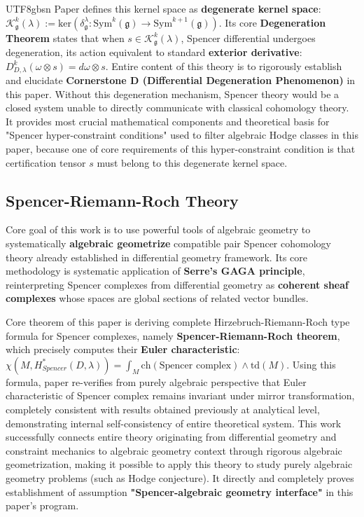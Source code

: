 \documentclass[a4paper,12pt]{extarticle}
\theoremstyle{definition}
\begin{document}
\begin{CJK}{UTF8}{gbsn}
Paper defines this kernel space as \textbf{degenerate kernel space}: $\mathcal{K}_{\mathfrak{g}}^k(\lambda) := \mathrm{ker}(\delta_{\mathfrak{g}}^\lambda : \mathrm{Sym}^k(\mathfrak{g}) \to \mathrm{Sym}^{k+1}(\mathfrak{g}))$. Its core \textbf{Degeneration Theorem} states that when $s \in \mathcal{K}_{\mathfrak{g}}^k(\lambda)$, Spencer differential undergoes degeneration, its action equivalent to standard \textbf{exterior derivative}: $D_{D,\lambda}^k(\omega \otimes s) = d\omega \otimes s$. Entire content of this theory is to rigorously establish and elucidate \textbf{Cornerstone D (Differential Degeneration Phenomenon)} in this paper. Without this degeneration mechanism, Spencer theory would be a closed system unable to directly communicate with classical cohomology theory. It provides most crucial mathematical components and theoretical basis for "Spencer hyper-constraint conditions" used to filter algebraic Hodge classes in this paper, because one of core requirements of this hyper-constraint condition is that certification tensor $s$ must belong to this degenerate kernel space.

\subsection{Spencer-Riemann-Roch Theory \cite{zheng2025spencer-riemann-roch}}
\label{subsec:roadmap_srr}
Core goal of this work \cite{zheng2025spencer-riemann-roch} is to use powerful tools of algebraic geometry to systematically \textbf{algebraic geometrize} compatible pair Spencer cohomology theory already established in differential geometry framework. Its core methodology is systematic application of \textbf{Serre's GAGA principle}, reinterpreting Spencer complexes from differential geometry as \textbf{coherent sheaf complexes} whose spaces are global sections of related vector bundles.

Core theorem of this paper is deriving complete Hirzebruch-Riemann-Roch type formula for Spencer complexes, namely \textbf{Spencer-Riemann-Roch theorem}, which precisely computes their \textbf{Euler characteristic}: $\chi(M, H_{Spencer}^*(D,\lambda)) = \int_M \mathrm{ch}(\text{Spencer complex}) \wedge \mathrm{td}(M)$. Using this formula, paper re-verifies from purely algebraic perspective that Euler characteristic of Spencer complex remains invariant under mirror transformation, completely consistent with results obtained previously at analytical level, demonstrating internal self-consistency of entire theoretical system. This work successfully connects entire theory originating from differential geometry and constraint mechanics to algebraic geometry context through rigorous algebraic geometrization, making it possible to apply this theory to study purely algebraic geometry problems (such as Hodge conjecture). It directly and completely proves establishment of assumption \textbf{"Spencer-algebraic geometry interface"} in this paper's program.


\end{CJK}
\end{document}
